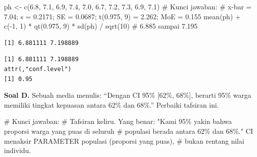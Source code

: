 \documentclass[
  indonesian,
  letterpaper,
]{book}
\newenvironment{Shaded}{\begin{snugshade}}{\end{snugshade}}
\newcommand{\CommentTok}[1]{\textcolor[rgb]{0.37,0.37,0.37}{#1}}
\newcommand{\DecValTok}[1]{\textcolor[rgb]{0.68,0.00,0.00}{#1}}
\newcommand{\FloatTok}[1]{\textcolor[rgb]{0.68,0.00,0.00}{#1}}
\newcommand{\FunctionTok}[1]{\textcolor[rgb]{0.28,0.35,0.67}{#1}}
\newcommand{\NormalTok}[1]{\textcolor[rgb]{0.00,0.23,0.31}{#1}}
\newcommand{\OtherTok}[1]{\textcolor[rgb]{0.00,0.23,0.31}{#1}}
\newcommand{\SpecialCharTok}[1]{\textcolor[rgb]{0.37,0.37,0.37}{#1}}
\begin{document}
\begin{Shaded}
\begin{Highlighting}[]
\NormalTok{ph }\OtherTok{\textless{}{-}} \FunctionTok{c}\NormalTok{(}\FloatTok{6.8}\NormalTok{, }\FloatTok{7.1}\NormalTok{, }\FloatTok{6.9}\NormalTok{, }\FloatTok{7.4}\NormalTok{, }\FloatTok{7.0}\NormalTok{, }\FloatTok{6.7}\NormalTok{, }\FloatTok{7.2}\NormalTok{, }\FloatTok{7.3}\NormalTok{, }\FloatTok{6.9}\NormalTok{, }\FloatTok{7.1}\NormalTok{)}
\CommentTok{\# Kunci jawaban:}
\CommentTok{\# x{-}bar = 7.04; s = 0.2171; SE = 0.0687; t(0.975, 9) = 2.262; MoE = 0.155}
\FunctionTok{mean}\NormalTok{(ph) }\SpecialCharTok{+} \FunctionTok{c}\NormalTok{(}\SpecialCharTok{{-}}\DecValTok{1}\NormalTok{, }\DecValTok{1}\NormalTok{) }\SpecialCharTok{*} \FunctionTok{qt}\NormalTok{(}\FloatTok{0.975}\NormalTok{, }\DecValTok{9}\NormalTok{) }\SpecialCharTok{*} \FunctionTok{sd}\NormalTok{(ph) }\SpecialCharTok{/} \FunctionTok{sqrt}\NormalTok{(}\DecValTok{10}\NormalTok{)   }\CommentTok{\# 6.885 sampai 7.195}
\end{Highlighting}
\end{Shaded}

\begin{verbatim}
[1] 6.881111 7.198889
\end{verbatim}

\begin{Shaded}
\end{Shaded}

\begin{verbatim}
[1] 6.881111 7.198889
attr(,"conf.level")
[1] 0.95
\end{verbatim}

\textbf{Soal D.} Sebuah media menulis: ``Dengan CI 95\% {[}62\%,
68\%{]}, berarti 95\% warga memiliki tingkat kepuasan antara 62\% dan
68\%.'' Perbaiki tafsiran ini.

\begin{Shaded}
\begin{Highlighting}[]
\CommentTok{\# Kunci jawaban:}
\CommentTok{\# Tafsiran keliru. Yang benar: "Kami 95\% yakin bahwa proporsi warga yang puas di seluruh}
\CommentTok{\# populasi berada antara 62\% dan 68\%." CI menaksir PARAMETER populasi (proporsi yang puas),}
\CommentTok{\# bukan rentang nilai individu.}
\end{Highlighting}
\end{Shaded}
\end{document}
